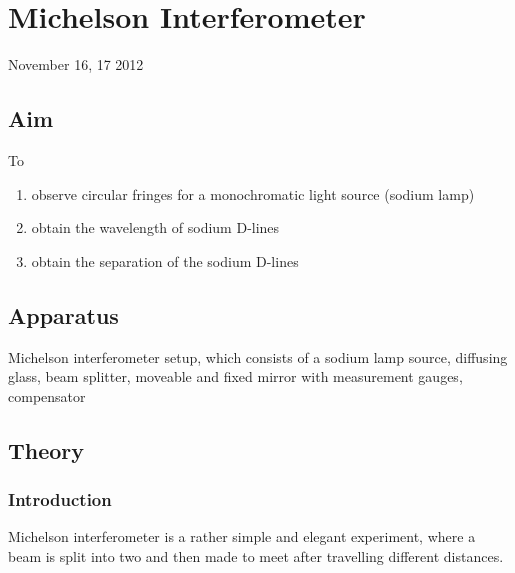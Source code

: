 \chapter{Michelson Interferometer}
\begin{flushright}
November 16, 17 2012
\end{flushright}
\section{Aim}
	To
	\begin{enumerate}
		\item observe circular fringes for a monochromatic light source (sodium lamp)
		\item obtain the wavelength of sodium D-lines
		\item obtain the separation of the sodium D-lines
	\end{enumerate}

\section{Apparatus}	
	Michelson interferometer setup, which consists of a sodium lamp source, diffusing glass, beam splitter, moveable and fixed mirror with measurement gauges, compensator

\section{Theory}
	\subsection{Introduction}
		Michelson interferometer is a rather simple and elegant experiment, where a beam is split into two and then made to meet after travelling different distances. 
